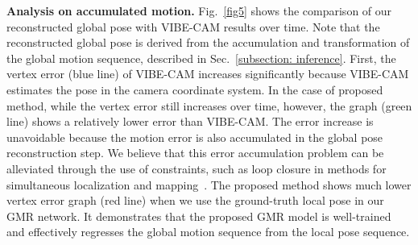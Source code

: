 \documentclass[10pt,twocolumn,letterpaper]{article}
\begin{document}


\textbf{Analysis on accumulated motion.} Fig.~\ref{fig5} shows the comparison of our reconstructed global pose with VIBE-CAM results over time. Note that the reconstructed global pose is derived from the accumulation and transformation of the global motion sequence, described in Sec.~\ref{subsection: inference}. First, the vertex error (blue line) of VIBE-CAM increases significantly because VIBE-CAM estimates the pose in the camera coordinate system. In the case of proposed method, while the vertex error still increases over time, however, the graph (green line) shows a relatively lower error than VIBE-CAM. The error increase is unavoidable because the motion error is also accumulated in the global pose reconstruction step. We believe that this error accumulation problem can be alleviated through the use of constraints, such as loop closure in methods for simultaneous localization and mapping~\cite{strasdat2011double}. The proposed method shows much lower vertex error graph (red line) when we use the ground-truth local pose in our GMR network. It demonstrates that the proposed GMR model is well-trained and effectively regresses the global motion sequence from the local pose sequence.
\end{document}
